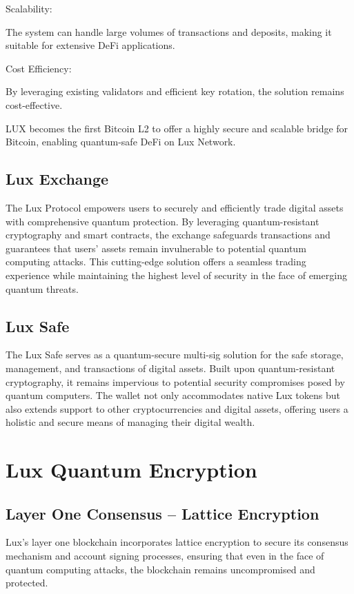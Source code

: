 \documentclass[11pt]{article}
\begin{document}
Scalability:


The system can handle large volumes of transactions and deposits, making it suitable for extensive DeFi applications.


Cost Efficiency:


By leveraging existing validators and efficient key rotation, the solution remains cost-effective.


LUX becomes the first Bitcoin L2 to offer a highly secure and scalable bridge for Bitcoin, enabling quantum-safe DeFi on Lux Network.


\subsection{Lux Exchange}

The Lux Protocol empowers users to securely and efficiently trade digital assets with comprehensive quantum protection. By leveraging quantum-resistant cryptography and smart contracts, the exchange safeguards transactions and guarantees that users' assets remain invulnerable to potential quantum computing attacks. This cutting-edge solution offers a seamless trading experience while maintaining the highest level of security in the face of emerging quantum threats.


\subsection{Lux Safe}

The Lux Safe serves as a quantum-secure multi-sig solution for the safe storage, management, and transactions of digital assets. Built upon quantum-resistant cryptography, it remains impervious to potential security compromises posed by quantum computers. The wallet not only accommodates native Lux tokens but also extends support to other cryptocurrencies and digital assets, offering users a holistic and secure means of managing their digital wealth.


\section{Lux Quantum Encryption}

\subsection{Layer One Consensus -- Lattice Encryption}

Lux's layer one blockchain incorporates lattice encryption to secure its consensus mechanism and account signing processes, ensuring that even in the face of quantum computing attacks, the blockchain remains uncompromised and protected.
\end{document}
